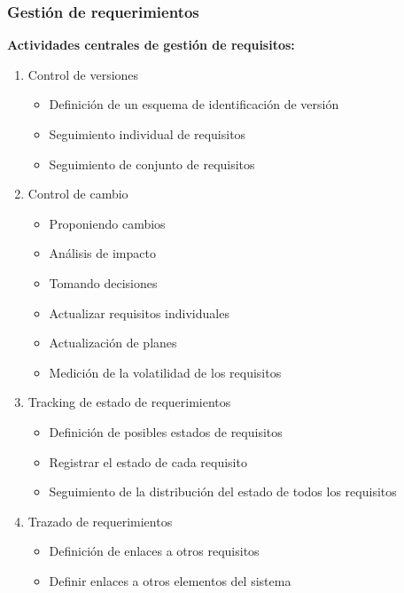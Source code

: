     \subsubsection*{Gestión de requerimientos}
    
    \textbf{Actividades centrales de gestión de requisitos:}
    
    \begin{enumerate}
        \item Control de versiones
        \begin{itemize}
            \item Definición de un esquema de identificación de versión
            \item Seguimiento individual de requisitos
            \item Seguimiento de conjunto de requisitos
        \end{itemize}
        \item Control de cambio
        \begin{itemize}
            \item Proponiendo cambios
            \item Análisis de impacto
            \item Tomando decisiones
            \item Actualizar requisitos individuales
            \item Actualización de planes
            \item Medición de la volatilidad de los requisitos
        \end{itemize}
        \item Tracking de estado de requerimientos
        \begin{itemize}
            \item Definición de posibles estados de requisitos
            \item Registrar el estado de cada requisito
            \item Seguimiento de la distribución del estado de todos los requisitos
        \end{itemize}
        \item Trazado de requerimientos
        \begin{itemize}
            \item Definición de enlaces a otros requisitos
            \item Definir enlaces a otros elementos del sistema
        \end{itemize}
    \end{enumerate}
    
